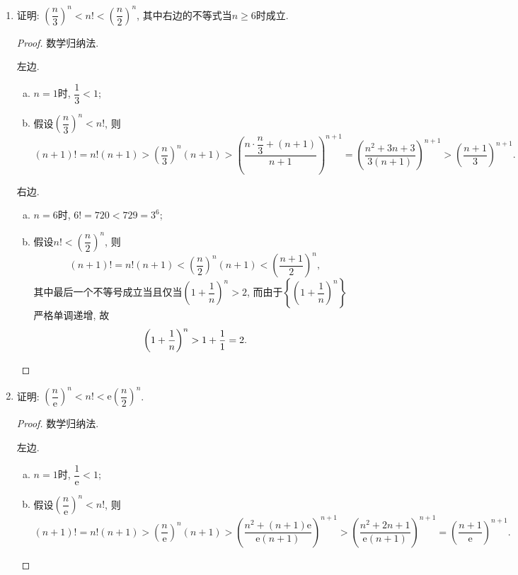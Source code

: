 \documentclass[a4paper,11pt,twoside]{ctexbook}
\newcommand{\e}{\mathrm e}
\begin{document}
\begin{enumerate}
\begin{proof}
\begin{enumerate}[(1)]
\begin{enumerate}[(a)]
				            \item 若$a_n<a_{n+2}, \forall n>N$. 则$\{a_{2n-1}\}, \{a_{2n}\}$收敛, 设其极限分别为$\alpha,\beta$, 则显然$\alpha,\beta>0$. 故$\lim\limits_{n\to\infty} \dfrac{a_n}{a_{n+1}+a_{n+2}}=\lim\limits_{n\to\infty} \dfrac{a_{2n}}{a_{2n+1}+a_{2n+2}}=\dfrac{\beta}{\alpha+\beta}>0$.
			            \end{enumerate}
			            均与$\lim\limits_{n\to\infty} \dfrac{a_n}{a_{n+1}+a_{n+2}}=0$矛盾. \qedhere
		      \end{enumerate}
	      \end{proof}

	\item 证明: $\left(\dfrac{n}{3}\right)^n<n!<\left(\dfrac{n}{2}\right)^n$, 其中右边的不等式当$n\geqslant 6$时成立.
	      \begin{proof}
		      数学归纳法.

		      左边.
		      \begin{enumerate}[(a)]
			      \item $n=1$时, $\dfrac{1}{3}<1$;
			      \item 假设$\left(\dfrac{n}{3}\right)^n<n!$, 则
			            \[
				            (n+1)!=n!(n+1)>\left(\dfrac{n}{3}\right)^n(n+1)>\left(\dfrac{n\cdot\dfrac{n}{3}+(n+1)}{n+1}\right)^{n+1}=\left(\dfrac{n^2+3n+3}{3(n+1)}\right)^{n+1}>\left(\dfrac{n+1}{3}\right)^{n+1}.
			            \]
		      \end{enumerate}

		      右边.
		      \begin{enumerate}[(a)]
			      \item $n=6$时, $6!=720<729=3^6$;
			      \item 假设$n!<\left(\dfrac{n}{2}\right)^n$, 则
			            \[
				            (n+1)!=n!(n+1)<\left(\dfrac{n}{2}\right)^n(n+1)<\left(\dfrac{n+1}{2}\right)^n,
			            \]
			            其中最后一个不等号成立当且仅当$\left(1+\dfrac{1}{n}\right)^n>2$, 而由于$\left\{\left(1+\dfrac{1}{n}\right)^n\right\}$严格单调递增, 故
			            \[
				            \left(1+\dfrac{1}{n}\right)^n>1+\dfrac{1}{1}=2.\qedhere
			            \]
		      \end{enumerate}
	      \end{proof}

	\item 证明: $\left(\dfrac{n}{\e}\right)^n<n!<\e\left(\dfrac{n}{2}\right)^n$.
	      \begin{proof}
		      数学归纳法.

		      左边.
		      \begin{enumerate}[(a)]
			      \item $n=1$时, $\dfrac{1}{\e}<1$;
			      \item 假设$\left(\dfrac{n}{\e}\right)^n<n!$, 则
			            \[
				            (n+1)!=n!(n+1)>\left(\dfrac{n}{\e}\right)^n(n+1)>\left(\dfrac{n^2+(n+1)\e}{\e(n+1)}\right)^{n+1}>\left(\dfrac{n^2+2n+1}{\e(n+1)}\right)^{n+1}=\left(\dfrac{n+1}{\e}\right)^{n+1}.
			            \]
		      \end{enumerate}


\end{proof}
\end{enumerate}
\end{document}
